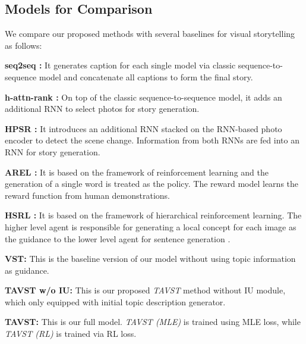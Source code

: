 \documentclass[11pt]{article}
\newcommand{\citep}{\cite}
\begin{document}
\subsection{Models for Comparison}
We compare our proposed methods with several baselines for visual storytelling  as follows:


\textbf{seq2seq \citep{huang2016visual}:} It generates caption for each single model via classic sequence-to-sequence model and concatenate all captions to form the final story.
	
\textbf{h-attn-rank \citep{yu2017hierarchically}:} On top of the classic sequence-to-sequence model, it adds an additional RNN to select photos for story generation. 

\textbf{HPSR \citep{wang2019hierarchical}:} It introduces an additional RNN stacked on the RNN-based photo encoder to detect the scene change. Information from both RNNs are fed into an RNN for story generation. 

\textbf{AREL \citep{Wang:2018tda}:} It is based on the framework of reinforcement learning and the generation of a single word is treated as the policy. The reward model learns the reward function from human demonstrations.


\textbf{HSRL \citep{huang2019hierarchically}:} It is based on the framework of hierarchical reinforcement learning. The higher level agent is responsible for generating a local concept for each image as the guidance to the lower level agent for sentence generation . 

\textbf{VST:} This is the baseline version of our model without using topic information as guidance.

\textbf{TAVST w/o IU:} This is our proposed \emph{TAVST} method without IU module, which only equipped with initial topic description generator. 

\textbf{TAVST:} This is our full model. \emph{TAVST (MLE)} is trained using MLE loss, while \emph{TAVST (RL)} is trained via RL loss. 
\end{document}
